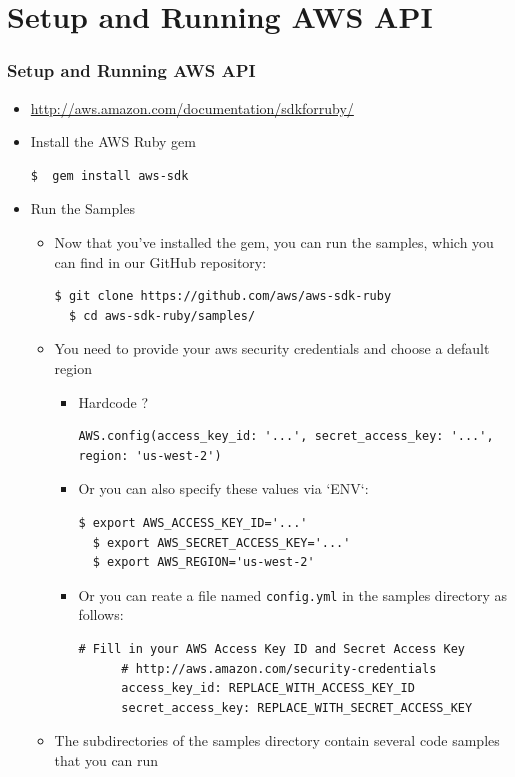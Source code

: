 \documentclass{beamer}
\begin{document}
\section{Setup and Running AWS API}
\begin{frame}
\frametitle{Setup and Running AWS API}
\begin{itemize}
  \item \url{http://aws.amazon.com/documentation/sdkforruby/}
  \item  Install the AWS Ruby gem

\lstset{language=shell}
\begin{lstlisting}[escapechar=!]
$  gem install aws-sdk
\end{lstlisting}

  \item Run the Samples
  \begin{itemize}
 


    \item Now that you’ve installed the gem, you can run the samples, which you can find in our GitHub repository:

\lstset{language=shell}
\begin{lstlisting}[escapechar=!]
  $ git clone https://github.com/aws/aws-sdk-ruby
  $ cd aws-sdk-ruby/samples/
\end{lstlisting}

  \item You need to provide your \acrshort{aws} security credentials and choose a default region
    \begin{itemize}
    
      \item Hardcode ?
\begin{lstlisting}[escapechar=!]
     AWS.config(access_key_id: '...', secret_access_key: '...', region: 'us-west-2')
\end{lstlisting}
      \item Or you can also specify these values via `ENV`:
\lstset{language=shell}
\begin{lstlisting}[escapechar=!]
  $ export AWS_ACCESS_KEY_ID='...'
  $ export AWS_SECRET_ACCESS_KEY='...'
  $ export AWS_REGION='us-west-2'
\end{lstlisting}


      \item Or you can reate a file named \texttt{config.yml} in the samples directory as follows:
\lstset{language=Ruby, style=eclipse}
\begin{lstlisting}[escapechar=!]
      # Fill in your AWS Access Key ID and Secret Access Key
      # http://aws.amazon.com/security-credentials
      access_key_id: REPLACE_WITH_ACCESS_KEY_ID
      secret_access_key: REPLACE_WITH_SECRET_ACCESS_KEY
\end{lstlisting}
    \end{itemize}
  \item The subdirectories of the samples directory contain several code samples that you can run
  \end{itemize}
\end{itemize}

\end{frame}
\end{document}
